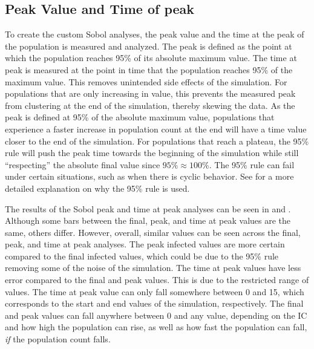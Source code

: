 \subsection{Peak Value and Time of peak}
To create the custom Sobol analyses, the peak value and the time at the peak of the population is measured and analyzed. 
The peak is defined as the point at which the population reaches 95\% of its absolute maximum value. 
The time at peak is measured at the point in time that the population reaches 95\% of the maximum value. 
This removes unintended side effects of the simulation. 
For populations that are only increasing in value, this prevents the measured peak from clustering at the end of the simulation, thereby skewing the data. 
As the peak is defined at 95\% of the absolute maximum value, populations that experience a faster increase in population count at the end will have a time value closer to the end of the simulation. 
For populations that reach a plateau, the 95\% rule will push the peak time towards the beginning of the simulation while still “respecting” the absolute final value since $95\% \approx 100\%$. 
The 95\% rule can fail under certain situations, such as when there is cyclic behavior. 
See  for a more detailed explanation on why the 95\% rule is used. 


The results of the Sobol peak and time at peak analyses can be seen in  and . 
Although some bars between the final, peak, and time at peak values are the same, others differ. 
However, overall, similar values can be seen across the final, peak, and time at peak analyses. 
The peak infected values are more certain compared to the final infected values, which could be due to the 95\% rule removing some of the noise of the simulation. 
The time at peak values have less error compared to the final and peak values. 
This is due to the restricted range of values. The time at peak value can only fall somewhere between 0 and 15, which corresponds to the start and end values of the simulation, respectively. 
The final and peak values can fall anywhere between 0 and any value, depending on the IC and how high the population can rise, as well as how fast the population can fall, \textit{if} the population count falls. 

